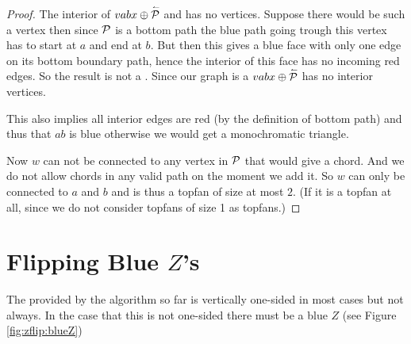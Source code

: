 \begin{proof}
      The interior of  $vabx \oplus \rev \P$ and has no vertices. Suppose there would be such a vertex then since $\P$ is a bottom path the blue path going trough this vertex has to start at $a$ and end at $b$. But then this gives a blue face with only one edge on its bottom boundary path, hence the interior of this face has no incoming red edges.  So the result is not a \rel. Since our graph is a \rel $vabx \oplus \rev \P$ has no interior vertices.

      This also implies all interior edges are red (by the definition of bottom path) and thus that $ab$ is blue otherwise we would get a monochromatic triangle.

      Now $w$ can not be connected to any vertex in $\P$ that would give a chord. And we do not allow chords in any valid path on the moment we add it. So $w$ can only be connected to $a$ and $b$ and is thus a topfan of size at most $2$. (If it is a topfan at all, since we do not consider topfans of size 1 as topfans.)
    \end{proof}

\newpage
\section{Flipping Blue $Z$'s}
    The \rel provided by the algorithm so far is vertically one-sided in most cases but not always. In the case that this \rel is not one-sided there must be a blue $Z$ (see Figure \ref{fig:zflip:blueZ})

